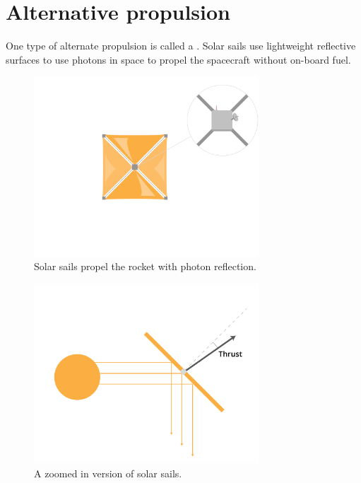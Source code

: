 \section{Alternative propulsion}

One type of alternate propulsion is called a . Solar sails use lightweight reflective surfaces to use photons in space to propel the spacecraft without on-board fuel.

\begin{figure}[htbp]
    \centering
	\includegraphics[width=0.75\textwidth]{solarSail.png}
    \caption{Solar sails propel the rocket with photon reflection.}
    \label{fig:solarSail}
\end{figure}

\begin{figure}[htbp]
    \centering
	\includegraphics[width=0.75\textwidth]{solarSailDiagram.png}
    \caption{A zoomed in version of solar sails.}
    \label{fig:solarSail}
\end{figure}

